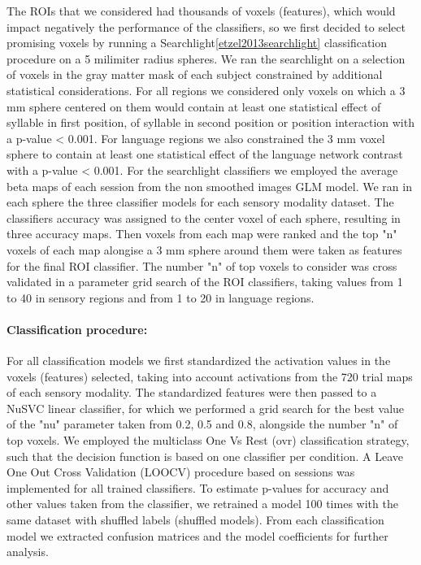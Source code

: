 The ROIs that we considered had thousands of voxels (features), which would impact negatively the performance of the classifiers, so we first decided to select promising voxels by running a Searchlight\ref{etzel2013searchlight} classification procedure on a 5 milimiter radius spheres.
We ran the searchlight on a selection of voxels in the gray matter mask of each subject constrained by additional statistical considerations.
For all regions we considered only voxels on which a 3 mm sphere centered on them would contain at least one statistical effect of syllable in first position, of syllable in second position or position interaction with a p-value < 0.001.
For language regions we also constrained the 3 mm voxel sphere to contain at least one statistical effect of the language network contrast with a p-value < 0.001.
For the searchlight classifiers we employed the average beta maps of each session from the non smoothed images GLM model.
We ran in each sphere the three classifier models for each sensory modality dataset.
The classifiers accuracy was assigned to the center voxel of each sphere, resulting in three accuracy maps.
Then voxels from each map were ranked and the top "n" voxels of each map alongise a 3 mm sphere around them were taken as features for the final ROI classifier.
The number "n" of top voxels to consider was cross validated in a parameter grid search of the ROI classifiers, taking values from 1 to 40 in sensory regions and from 1 to 20 in language regions.


\paragraph{Classification procedure:}
For all classification models we first standardized the activation values in the voxels (features) selected, taking into account activations from the 720 trial maps of each sensory modality.
The standardized features were then passed to a NuSVC linear classifier, for which we performed a grid search for the best value of the "nu" parameter taken from 0.2, 0.5 and 0.8, alongside the number "n" of top voxels.
We employed the multiclass One Vs Rest (ovr) classification strategy, such that the decision function is based on one classifier per condition.
A Leave One Out Cross Validation (LOOCV) procedure based on sessions was implemented for all trained classifiers.
To estimate p-values for accuracy and other values taken from the classifier, we retrained a model 100 times with the same dataset with shuffled labels (shuffled models).
From each classification model we extracted confusion matrices and the model coefficients for further analysis.


